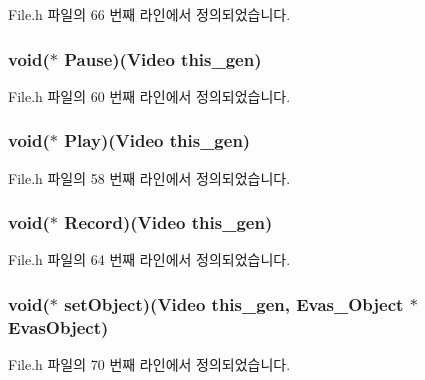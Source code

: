 File.\-h 파일의 66 번째 라인에서 정의되었습니다.

\hypertarget{struct___video_af1d96a39825d2bb1300661601fd0aa7a}{
\subsubsection[{Pause}]{\setlength{\rightskip}{0pt plus 5cm}void($\ast$  Pause)({\bf Video} this\-\_\-gen)}}\label{struct___video_af1d96a39825d2bb1300661601fd0aa7a}


File.\-h 파일의 60 번째 라인에서 정의되었습니다.

\hypertarget{struct___video_a638d742602c39ab64bbded0f4521d106}{
\subsubsection[{Play}]{\setlength{\rightskip}{0pt plus 5cm}void($\ast$  Play)({\bf Video} this\-\_\-gen)}}\label{struct___video_a638d742602c39ab64bbded0f4521d106}


File.\-h 파일의 58 번째 라인에서 정의되었습니다.

\hypertarget{struct___video_aabb39795a3af7a469d10950d2b088ce6}{
\subsubsection[{Record}]{\setlength{\rightskip}{0pt plus 5cm}void($\ast$  Record)({\bf Video} this\-\_\-gen)}}\label{struct___video_aabb39795a3af7a469d10950d2b088ce6}


File.\-h 파일의 64 번째 라인에서 정의되었습니다.

\hypertarget{struct___video_a1245c2a3dff66080a4c0f9fd812c25e1}{
\subsubsection[{set\-Object}]{\setlength{\rightskip}{0pt plus 5cm}void($\ast$  set\-Object)({\bf Video} this\-\_\-gen, Evas\-\_\-\-Object $\ast$Evas\-Object)}}\label{struct___video_a1245c2a3dff66080a4c0f9fd812c25e1}


File.\-h 파일의 70 번째 라인에서 정의되었습니다.

